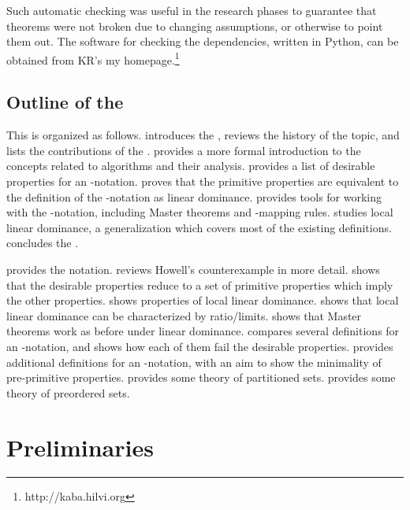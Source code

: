 \documentclass[b5paper, english, oneside]{memoir}
\begin{document}
Such automatic checking was useful in the research phases to guarantee that theorems were not broken due to changing assumptions, or otherwise to point them out. The software for checking the dependencies, written in Python, can be obtained from 
\ifwe
KR's
\else
my
\fi
homepage.\footnote{http://kaba.hilvi.org}

\section{Outline of the \manuscript{}}

This \manuscript{} is organized as follows.  introduces the \manuscript{}, reviews the history of the topic, and lists the contributions of the \manuscript{}.  provides a more formal introduction to the concepts related to algorithms and their analysis.  provides a list of desirable properties for an -notation.  proves that the primitive properties are equivalent to the definition of the -notation as linear dominance.  provides tools for working with the -notation, including Master theorems and -mapping rules.  studies local linear dominance, a generalization which covers most of the existing definitions.  concludes the \manuscript{}.

 provides the notation.  reviews Howell's counterexample in more detail.  shows that the desirable properties reduce to a set of \nprim{} primitive properties which imply the other properties.  shows properties of local linear dominance.  shows that local linear dominance can be characterized by ratio\-/limits.  shows that Master theorems work as before under linear dominance.  compares several definitions for an -notation, and shows how each of them fail the desirable properties.  provides additional definitions for an -notation, with an aim to show the minimality of pre-primitive properties.  provides some theory of partitioned sets.  provides some theory of preordered sets.

\chapter{Preliminaries}
\label{Preliminaries}
\end{document}
